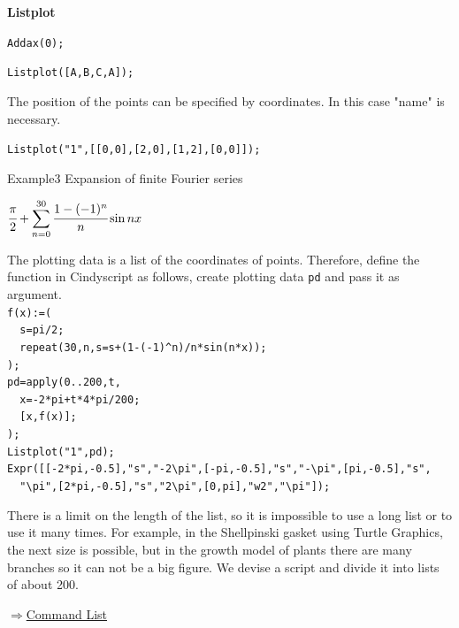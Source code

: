 \documentclass[papersize,a4paper,12pt]{article}
\newenvironment{cmd}[2]{
\hypertarget{#2}{}
\begin{center}{\bf\large #1}\end{center}
\begin{description}
}{
\end{description}
\begin{flushright} \hyperlink{functionlist}{$\Rightarrow$Command List}\end{flushright}
}
\begin{document}
\begin{cmd}{Listplot}{listplot}
\hspace{10mm}\verb|Addax(0);|

\hspace{10mm}\verb|Listplot([A,B,C,A]);|

\hspace{20mm}

The position of the points can be specified by coordinates. 
In this case "name"  is necessary. 

\hspace{10mm}\verb|Listplot("1",[[0,0],[2,0],[1,2],[0,0]]);|

\item[Example3]\mbox{}
Expansion of finite Fourier series

\hspace{20mm}$\displaystyle{\cfrac{\pi}{2}+\sum_{n=0}^{30} \cfrac{1-(-1)^n}{n}\sin nx}$

The plotting data is a list of the coordinates of points. Therefore, define the function in Cindyscript as follows, create plotting data \verb|pd| and pass it as argument. \\

\verb|f(x):=(|\\
\verb|  s=pi/2;|\\
\verb#  repeat(30,n,s=s+(1-(-1)^n)/n*sin(n*x));#\\
\verb|);|\\
\verb|pd=apply(0..200,t,|\\
\verb|  x=-2*pi+t*4*pi/200;|\\
\verb|  [x,f(x)];|\\
\verb|);|\\
\verb|Listplot("1",pd);|\\
\verb|Expr([[-2*pi,-0.5],"s","-2\pi",[-pi,-0.5],"s","-\pi",[pi,-0.5],"s",|\\
\verb|  "\pi",[2*pi,-0.5],"s","2\pi",[0,pi],"w2","\pi"]);|\\
\begin{center} 

\end{center}
There is a limit on the length of the list, so it is impossible to use a long list or to use it many times. 
For example, in the Shellpinski gasket using Turtle Graphics, the next size is possible, but in the growth model of plants there are many branches so it can not be a big figure. 
We devise a script and divide it into lists of about 200. \\
\begin{center} 

\end{center}
\end{cmd}
\end{document}
